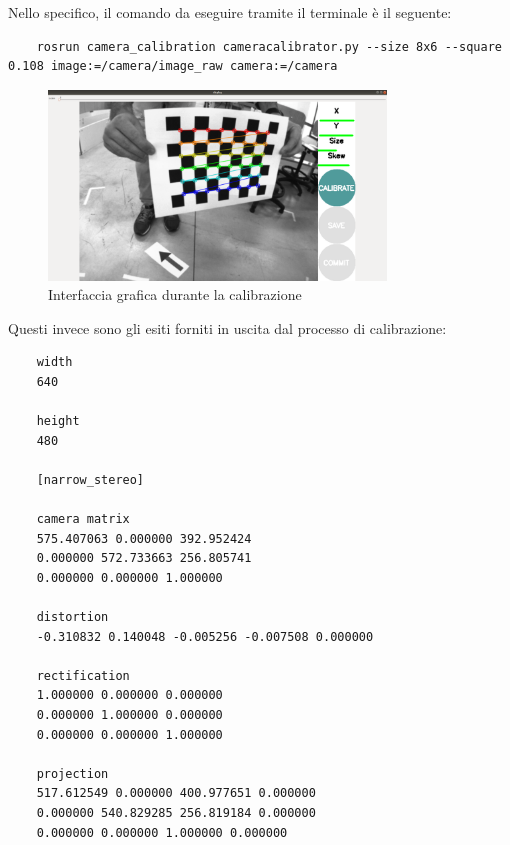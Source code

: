 Nello specifico, il comando da eseguire tramite il terminale è il seguente:

\begin{lstlisting}
	rosrun camera_calibration cameracalibrator.py --size 8x6 --square 0.108 image:=/camera/image_raw camera:=/camera
\end{lstlisting}

\begin{figure}[H]
	\centering
	\includegraphics[width=0.8\textwidth]{Immagini/Calibration.png}
	\caption{Interfaccia grafica durante la calibrazione}
	\label{fig:calibrationInterface}
\end{figure}

Questi invece sono gli esiti forniti in uscita dal processo di calibrazione:

\begin{lstlisting}
	width
	640
	
	height
	480
	
	[narrow_stereo]
	
	camera matrix
	575.407063 0.000000 392.952424
	0.000000 572.733663 256.805741
	0.000000 0.000000 1.000000
	
	distortion
	-0.310832 0.140048 -0.005256 -0.007508 0.000000
	
	rectification
	1.000000 0.000000 0.000000
	0.000000 1.000000 0.000000
	0.000000 0.000000 1.000000
	
	projection
	517.612549 0.000000 400.977651 0.000000
	0.000000 540.829285 256.819184 0.000000
	0.000000 0.000000 1.000000 0.000000
\end{lstlisting}


